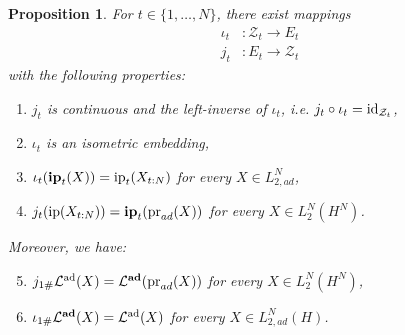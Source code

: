 \documentclass[a4paper]{amsart}
\numberwithin{theorem}{section}
\newtheorem{proposition}[theorem]{Proposition}
\theoremstyle{definition}
\newcommand{\pr}{\textup{pr}}
\newcommand{\id}{\textup{id}}
\newcommand{\law}{\mathcal{L}}
\renewcommand{\H}{H}
\newcommand{\ip}{\textup{ip}}
\newcommand{\lawad}{\law^{\textup{ad}}}
\newcommand{\Zc}{\mathcal{Z}}
\newcommand{\ipp}{\mathbf{ip}}
\newcommand{\lawadd}{\law^{\textnormal{\textbf{ad}}}}
\begin{document}
\begin{proposition}\label{prop:translation}
For $t \in \{1,\dots,N\}$, there exist mappings 
\begin{align*}
    \iota_t &: \Zc_t \to E_t \\
    j_t &: E_t \to \Zc_t
\end{align*} 
with the following properties:
\begin{enumerate}
    \item $j_t$ is continuous and the left-inverse of $\iota_t$, i.e. $j_t \circ \iota_t = \id_{\Zc_t}$,
    \item $\iota_t$ is an isometric embedding,
    \item $\iota_t(\ipp_t(X)) = \ip_t(X_{t:N})$ for every $X \in L_{2,ad}^N$,
    \item $j_t(\ip(X_{t:N})) = \ipp_t(\pr_{ad}(X))$ for every $X \in L_2^N(H^N)$.
\end{enumerate}
Moreover, we have: 
\begin{enumerate}
\setcounter{enumi}{4}
    \item $j_{1\#}\lawad(X) = \lawadd(\pr_{ad}(X)) $ for every $X \in L_2^N(\H^N)$,
    \item $\iota_{1\#}\lawadd(X) = \lawad(X)$ for every $X \in L_{2,ad}^N(H)$.
\end{enumerate}

\end{proposition}
\end{document}

